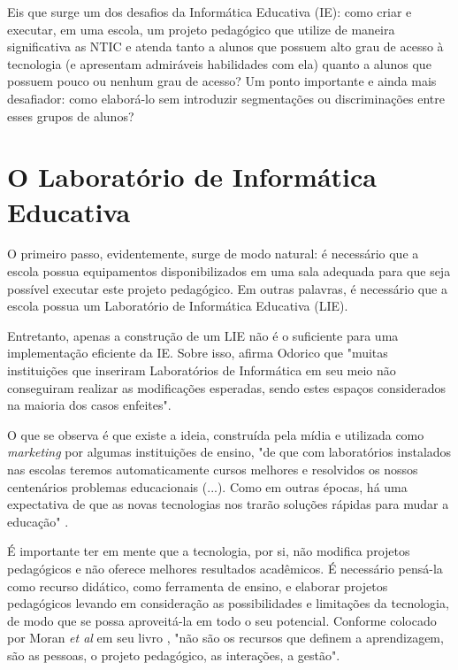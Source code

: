 Eis que surge um dos desafios da Informática Educativa (IE): como criar e executar, em uma escola, um projeto pedagógico que utilize de maneira significativa as NTIC e atenda tanto a alunos que possuem alto grau de acesso à tecnologia (e apresentam admiráveis habilidades com ela) quanto a alunos que possuem pouco ou nenhum grau de acesso? Um ponto importante e ainda mais desafiador: como elaborá-lo sem introduzir segmentações ou discriminações entre esses grupos de alunos?

\section{O Laboratório de Informática Educativa}\label{sec:LABEL_CHP_REF_TEO_SEC_LIE}

O primeiro passo, evidentemente, surge de modo natural: é necessário que a escola possua equipamentos disponibilizados em uma sala adequada para que seja possível executar este projeto pedagógico. Em outras palavras, é necessário que a escola possua um Laboratório de Informática Educativa (LIE).

Entretanto, apenas a construção de um LIE não é o suficiente para uma implementação eficiente da IE. Sobre isso, afirma Odorico \cite{art:REF_ART_ODORICO} que "muitas instituições que inseriram Laboratórios de Informática em seu meio não conseguiram realizar as modificações esperadas, sendo estes espaços considerados na maioria dos casos enfeites".

O que se observa é que existe a ideia, construída pela mídia e utilizada como \textit{marketing} por algumas instituições de ensino, "de que com laboratórios instalados nas escolas teremos automaticamente cursos melhores e resolvidos os nossos centenários problemas educacionais (...). Como em outras épocas, há uma expectativa de que as novas tecnologias nos trarão soluções rápidas para mudar a educação" \cite{art:REF_LIVRO_MORAN}.

É importante ter em mente que a tecnologia, por si, não modifica projetos pedagógicos e não oferece melhores resultados acadêmicos. É necessário pensá-la como recurso didático, como ferramenta de ensino, e elaborar projetos pedagógicos levando em consideração as possibilidades e limitações da tecnologia, de modo que se possa aproveitá-la em todo o seu potencial. Conforme colocado por Moran \textit{et al} em seu livro \cite{art:REF_LIVRO_MORAN}, "não são os recursos que definem a aprendizagem, são as pessoas, o projeto pedagógico, as interações, a gestão".


